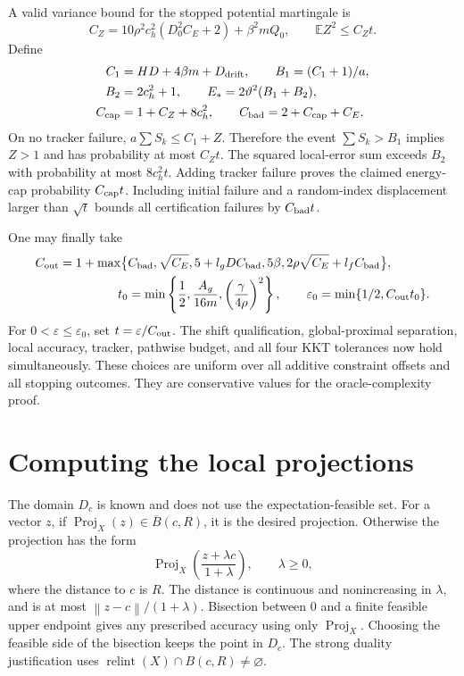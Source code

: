 \documentclass[11pt,a4paper]{article}
\newcommand{\E}{\mathbb E}
\newcommand{\eps}{\varepsilon}
\newcommand{\norm}[1]{\left\lVert#1\right\rVert}
\DeclareMathOperator{\Proj}{Proj}
\theoremstyle{remark}
\numberwithin{equation}{section}
\begin{document}
A valid variance bound for the stopped potential martingale is
\[
 C_Z=10\rho^2c_h^2(D_0^2C_E+2)+\beta^2mQ_0,
 \qquad \E Z^2\le C_Zt.
\]
Define
\begin{align*}
 C_1&=HD+4\beta m+D_{\rm drift},\qquad
 B_1=(C_1+1)/a,\\
 B_2&=2c_h^2+1,\qquad
 E_*=2\vartheta^2(B_1+B_2),\\
 C_{\rm cap}&=1+C_Z+8c_h^2,\qquad
 C_{\rm bad}=2+C_{\rm cap}+C_E.
\end{align*}
On no tracker failure, $a\sum S_k\le C_1+Z$. Therefore the event $\sum S_k>B_1$ implies $Z>1$ and has probability at most $C_Zt$. The squared local-error sum exceeds $B_2$ with probability at most $8c_h^2t$. Adding tracker failure proves the claimed energy-cap probability $C_{\rm cap}t$. Including initial failure and a random-index displacement larger than $\sqrt t$ bounds all certification failures by $C_{\rm bad}t$.

One may finally take
\begin{align*}
 C_{\rm out}=1+\max\bigl\{&C_{\rm bad},\sqrt{C_E},
 5+l_gD C_{\rm bad},5\beta,
 2\rho\sqrt{C_E}+l_f C_{\rm bad}\bigr\},\\
 t_0&=\min\left\{\frac12,\frac{A_g}{16m},
 \left(\frac\gamma{4\rho}\right)^2\right\},\qquad
 \eps_0=\min\{1/2,C_{\rm out}t_0\}.
\end{align*}
For $0<\eps\le\eps_0$, set $t=\eps/C_{\rm out}$. The shift qualification, global-proximal separation, local accuracy, tracker, pathwise budget, and all four KKT tolerances now hold simultaneously. These choices are uniform over all additive constraint offsets and all stopping outcomes. They are conservative values for the oracle-complexity proof.


\section{Computing the local projections}\label{app:projection}
The domain $D_c$ is known and does not use the expectation-feasible set. For a vector $z$, if $\Proj_X(z)\in\overline B(c,R)$, it is the desired projection. Otherwise the projection has the form
\[
 \Proj_X\left(\frac{z+\lambda c}{1+\lambda}\right),\qquad \lambda\ge0,
\]
where the distance to $c$ is $R$. The distance is continuous and nonincreasing in $\lambda$, and is at most $\norm{z-c}/(1+\lambda)$. Bisection between $0$ and a finite feasible upper endpoint gives any prescribed accuracy using only $\Proj_X$. Choosing the feasible side of the bisection keeps the point in $D_c$. The strong duality justification uses $\operatorname{relint}(X)\cap B(c,R)\ne\varnothing$.
\end{document}
